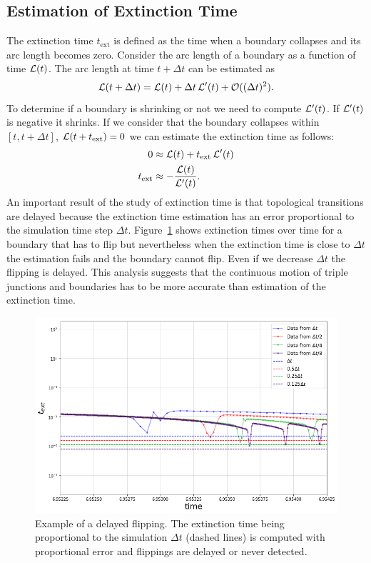 \subsection{Estimation of Extinction Time}
The extinction time $t_{\text{ext}}$ is defined as the time when a boundary collapses and its arc length becomes zero.
Consider the arc length of a boundary as a function of time $\mathcal{L}(t)$. 
The arc length at time $t+\Delta t$ can be estimated as
\begin{equation*}
    \mathcal{L}(t+\Delta t) = \mathcal{L}(t) + \Delta t\, \mathcal{L}'(t)+\mathcal{O}((\Delta t)^2).
\end{equation*}
To determine if a boundary is shrinking or not we need to compute $\mathcal{L}'(t)$. If $\mathcal{L}'(t)$ is negative it shrinks. If we consider that the boundary collapses within $[t, t+\Delta t]$, \ie $\mathcal{L}(t+t_{\text{ext}}) = 0$ we can estimate the extinction time as follows:
\begin{align*}
0 &\approx \mathcal{L}(t) + t_{\text{ext}} \,\mathcal{L}'(t)\\
t_{\text{ext}} &\approx -\dfrac{\mathcal{L}(t)}{\mathcal{L}'(t)}.
\end{align*}
%
An important result of the study of extinction time is that topological transitions are delayed because the extinction time estimation has an error proportional to the simulation time step $\Delta t$. Figure~\ref{fig:coupled_texts} shows extinction times over time for a boundary that has to flip but nevertheless when the extinction time is close to $\Delta t$ the estimation fails and the boundary cannot flip. 
Even if we decrease $\Delta t$ the flipping is delayed. 
This analysis suggests that the continuous motion of triple junctions and boundaries has to be more accurate than estimation of the extinction time.
%
\begin{figure}
    \centering
    \includegraphics[width=12cm]{figures/coupled/image_preview.png}
    \caption[Example of delayed flipping.]{Example of a delayed flipping. The extinction time being proportional to the simulation $\Delta t$ (dashed lines) is computed with proportional error and flippings are delayed or never detected.}
    \label{fig:coupled_texts}
\end{figure}
